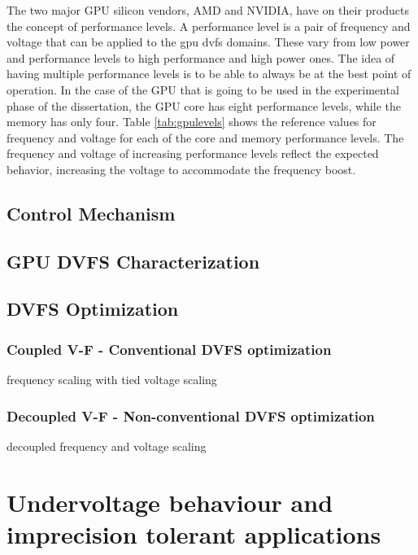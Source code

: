 The two major GPU silicon vendors, AMD and NVIDIA, have on their products the concept of performance levels. A performance level is a pair of frequency and voltage that can be applied to the \acrshort{gpu} \acrshort{dvfs} domains. These vary from low power and performance levels to high performance and high power ones. The idea of having multiple performance levels is to be able to always be at the best point of operation.  In the case of the GPU that is going to be used in the experimental phase of the dissertation, the GPU core has eight performance levels, while the memory has only four. Table \ref{tab:gpulevels} shows the reference values for frequency and voltage for each of the core and memory performance levels. The frequency and voltage of increasing performance levels reflect the expected behavior, increasing the voltage to accommodate the frequency boost.


\subsection{Control Mechanism}
\subsection{GPU DVFS Characterization}


\subsection{DVFS Optimization}
\label{section:DVFS_opt}

\subsubsection{Coupled V-F - Conventional DVFS optimization}

frequency scaling with tied voltage scaling

\subsubsection{Decoupled V-F - Non-conventional DVFS optimization}

decoupled frequency and voltage scaling

\section{Undervoltage behaviour and imprecision tolerant applications}
\label{section:und_beh}